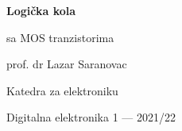 \begin{frame}[label=09_2-s001]{}
\centering
{\fontsize{25}{29}\selectfont\bfseries Logička kola\par sa MOS tranzistorima\par}
\vspace{7mm}{\Large 2. deo\par}
\vspace{8mm}prof. dr Lazar Saranovac\par Katedra za elektroniku\par Digitalna elektronika 1 — 2021/22
\end{frame}
